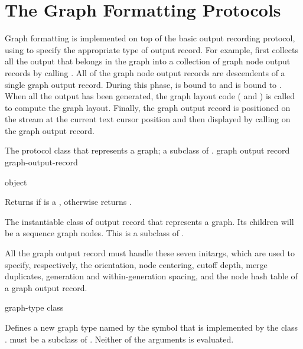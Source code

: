 \section {The Graph Formatting Protocols}

Graph formatting is implemented on top of the basic output recording protocol,
using  to specify the appropriate type of output
record.  For example,  first collects all the output
that belongs in the graph into a collection of graph node output records by
calling .  All of the graph node output records are
descendents of a single graph output record.  During this phase,
 is bound to  and  is bound
to .  When all the output has been generated, the graph layout code
( and ) is called to compute the
graph layout.  Finally, the graph output record is positioned on the stream at
the current text cursor position and then displayed by calling  on
the graph output record.



The protocol class that represents a graph; a subclass of .
 {graph output record} {graph-output-record}

 {object}

Returns  if  is a , otherwise
returns .


The instantiable class of output record that represents a graph.  Its children
will be a sequence graph nodes.  This is a subclass of .


All the graph output record must handle these seven initargs, which are used to
specify, respectively, the orientation, node centering, cutoff depth, merge
duplicates, generation and within-generation spacing, and the node hash table of
a graph output record.


 {graph-type class}

Defines a new graph type named by the symbol  that is
implemented by the class .   must be a subclass of
.  Neither of the arguments is evaluated.

